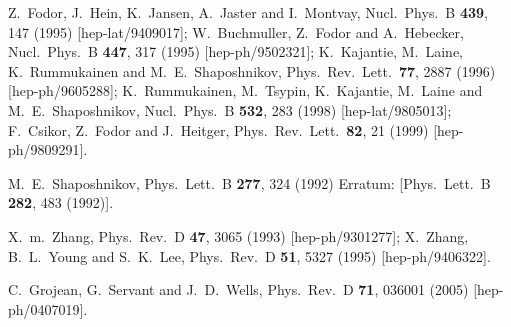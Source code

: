 \documentclass[aps,prd,11pt,tightenlines,superscriptaddress,nofootinbib,preprintnumbers,notitlepage]{revtex4-1}
\begin{document}
\begin{thebibliography}{99}
  Z.~Fodor, J.~Hein, K.~Jansen, A.~Jaster and I.~Montvay,
  Nucl.\ Phys.\ B {\bf 439}, 147 (1995)
  [hep-lat/9409017];
  W.~Buchmuller, Z.~Fodor and A.~Hebecker,
  Nucl.\ Phys.\ B {\bf 447}, 317 (1995)
  [hep-ph/9502321];
  K.~Kajantie, M.~Laine, K.~Rummukainen and M.~E.~Shaposhnikov,
  Phys.\ Rev.\ Lett.\  {\bf 77}, 2887 (1996)
  [hep-ph/9605288];
  K.~Rummukainen, M.~Tsypin, K.~Kajantie, M.~Laine and M.~E.~Shaposhnikov,
  Nucl.\ Phys.\ B {\bf 532}, 283 (1998)
  [hep-lat/9805013];
  F.~Csikor, Z.~Fodor and J.~Heitger,
  Phys.\ Rev.\ Lett.\  {\bf 82}, 21 (1999)
  [hep-ph/9809291].

  M.~E.~Shaposhnikov,
  Phys.\ Lett.\ B {\bf 277}, 324 (1992)
  Erratum: [Phys.\ Lett.\ B {\bf 282}, 483 (1992)].
  
  X.~m.~Zhang,
  Phys.\ Rev.\ D {\bf 47}, 3065 (1993)
  [hep-ph/9301277];
  X.~Zhang, B.~L.~Young and S.~K.~Lee,
  Phys.\ Rev.\ D {\bf 51}, 5327 (1995)
  [hep-ph/9406322].

  
  C.~Grojean, G.~Servant and J.~D.~Wells,
  Phys.\ Rev.\ D {\bf 71}, 036001 (2005)
  [hep-ph/0407019].
  

\end{thebibliography}
\end{document}
